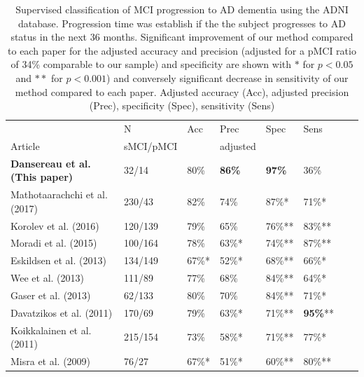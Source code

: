 \documentclass[authoryear]{elsarticle}
\begin{document}
\begin{table}[]
\centering
\caption{Supervised classification of MCI progression to AD dementia using the ADNI database. Progression time was establish if the the subject progresses to AD status in the next 36 months. Significant improvement of our method compared to each paper for the adjusted accuracy and precision (adjusted for a pMCI ratio of 34\% comparable to our sample) and specificity are shown with $*$ for $p<0.05$ and $**$ for $p<0.001$) and conversely significant decrease in sensitivity of our method compared to each paper. Adjusted accuracy (Acc), adjusted precision (Prec), specificity (Spec), sensitivity (Sens)}
\label{table_lit}
\begin{tabular}{llllllll}
                                       & N            & Acc      & Prec  & Spec   & Sens   \\
Article                                & sMCI/pMCI    &          & adjusted   &    &    \\ \hline
\textbf{Dansereau et al. (This paper)} & 32/14        & 80\%     & \textbf{86\%} & \textbf{97\%} & 36\%   \\
Mathotaarachchi et al. (2017)          & 230/43       & 82\%     & 74\%              & 87\%*           & 71\%*         \\
Korolev et al. (2016)                  & 120/139      & 79\%     & 65\%            & 76\%**          & 83\%**       \\
Moradi et al. (2015)                   & 100/164      & 78\%     & 63\%*            & 74\%**          & 87\%**          \\ 
Eskildsen et al. (2013)                & 134/149      & 67\%*   & 52\%*           & 68\%**         & 66\%*          \\ 
Wee et al. (2013)                      & 111/89       & 77\%     & 68\%            & 84\%**         & 64\%*          \\ 
Gaser et al. (2013)                    & 62/133       & 80\%     & 70\%           & 84\%**         & 71\%*          \\ 
Davatzikos et al. (2011)               & 170/69       & 79\%     & 63\%*           & 71\%**        & \textbf{95\%}** \\ 
Koikkalainen et al. (2011)             & 215/154      & 73\%    & 58\%*           & 71\%**        & 77\%*          \\ 
Misra et al. (2009)                    & 76/27        & 67\%*   & 51\%*         & 60\%**          & 80\%**          \\ 
\end{tabular}
\end{table}
\end{document}
